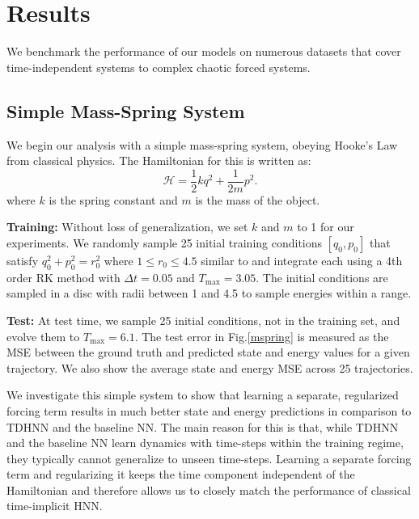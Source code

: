 \documentclass{article}
\begin{document}
\section{Results}

We benchmark the performance of our models on numerous datasets that cover time-independent systems to complex chaotic forced systems. 

\subsection{Simple Mass-Spring System}

We begin our analysis with a simple mass-spring system, obeying Hooke's Law from classical physics. The Hamiltonian for this is written as:
\begin{equation}
\mathcal{H} = \frac{1}{2}kq^2 + \frac{1}{2m}p^2. 
\end{equation}
where $k$ is the spring constant and $m$ is the mass of the object. 

\textbf{Training:} Without loss of generalization, we set $k$ and $m$ to 1 for our experiments. We randomly sample 25 initial training conditions $[q_0,p_0]$ that satisfy $q_0^2+p_0^2 = r_0^2$ where $1 \leq r_0 \leq 4.5$ similar to \cite{greydanus_hamiltonian_2019} and integrate each using a 4th order RK method with $\Delta t =0.05$ and $T_{\max} = 3.05$. The initial conditions are sampled in a disc with radii between 1 and 4.5 to sample energies within a range.

\textbf{Test:} At test time, we sample 25 initial conditions, not in the training set, and evolve them to $T_{\max}=6.1$. The test error in Fig.\ref{mspring} is measured as the MSE between the ground truth and predicted state and energy values for a given trajectory. We also show the average state and energy MSE across 25 trajectories. 

We investigate this simple system to show that learning a separate, regularized forcing term results in much better state and energy predictions in comparison to TDHNN and the baseline NN. The main reason for this is that, while TDHNN and the baseline NN learn dynamics with time-steps within the training regime, they typically cannot generalize to unseen time-steps. Learning a separate forcing term and regularizing it keeps the time component independent of the Hamiltonian and therefore allows us to closely match the performance of classical time-implicit HNN.
\end{document}
